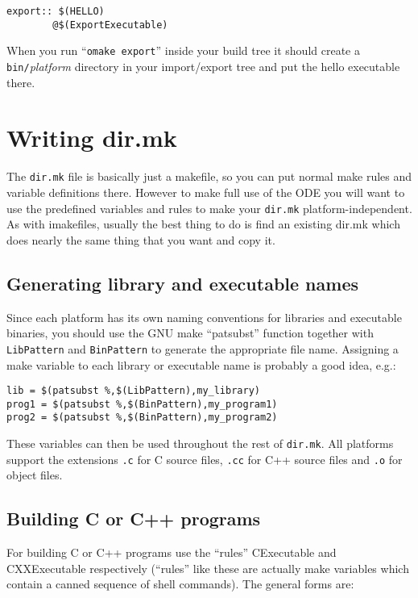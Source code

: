\documentclass[11pt,twoside,onecolumn]{article}
\begin{document}
{\small \begin{verbatim}
export:: $(HELLO)
        @$(ExportExecutable)
\end{verbatim}}

When you run ``{\tt omake export}'' inside your build tree it should create a
{\tt bin/}{\it platform} directory in your import/export tree and put the hello
executable there.


\section{Writing dir.mk}

The {\tt dir.mk} file is basically just a makefile, so you can put normal make
rules and variable definitions there.  However to make full use of the ODE you
will want to use the predefined variables and rules to make your {\tt dir.mk}
platform-independent.  As with imakefiles, usually the best thing to do is find
an existing dir.mk which does nearly the same thing that you want and copy it.

\subsection{Generating library and executable names}

Since each platform has its own naming conventions for libraries and executable
binaries, you should use the GNU make ``patsubst'' function together with {\tt
LibPattern} and {\tt BinPattern} to generate the appropriate file name.
Assigning a make variable to each library or executable name is probably a good
idea, e.g.:

{\small \begin{verbatim}
lib = $(patsubst %,$(LibPattern),my_library)
prog1 = $(patsubst %,$(BinPattern),my_program1)
prog2 = $(patsubst %,$(BinPattern),my_program2)
\end{verbatim}}

These variables can then be used throughout the rest of {\tt dir.mk}.  All
platforms support the extensions {\tt .c} for C source files, {\tt .cc} for C++
source files and {\tt .o} for object files.

\subsection{Building C or C++ programs}

For building C or C++ programs use the ``rules'' CExecutable and CXXExecutable
respectively (``rules'' like these are actually make variables which contain a
canned sequence of shell commands).  The general forms are:
\end{document}
